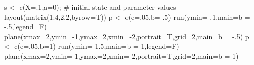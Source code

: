 \documentclass[
  a4paper,
  DIV=11,
  numbers=noendperiod,
  oneside]{scrreprt}
\newenvironment{Shaded}{}{}
\newcommand{\AttributeTok}[1]{\textcolor[rgb]{0.84,0.23,0.29}{#1}}
\newcommand{\CommentTok}[1]{\textcolor[rgb]{0.42,0.45,0.49}{#1}}
\newcommand{\DecValTok}[1]{\textcolor[rgb]{0.00,0.36,0.77}{#1}}
\newcommand{\FloatTok}[1]{\textcolor[rgb]{0.00,0.36,0.77}{#1}}
\newcommand{\FunctionTok}[1]{\textcolor[rgb]{0.44,0.26,0.76}{#1}}
\newcommand{\NormalTok}[1]{\textcolor[rgb]{0.14,0.16,0.18}{#1}}
\newcommand{\OtherTok}[1]{\textcolor[rgb]{0.44,0.26,0.76}{#1}}
\newcommand{\SpecialCharTok}[1]{\textcolor[rgb]{0.00,0.36,0.77}{#1}}
\newcommand{\StringTok}[1]{\textcolor[rgb]{0.01,0.18,0.38}{#1}}
\begin{document}
\begin{Shaded}
\begin{Highlighting}[]
\NormalTok{s }\OtherTok{\textless{}{-}} \FunctionTok{c}\NormalTok{(}\AttributeTok{X=}\NormalTok{.}\DecValTok{1}\NormalTok{,}\AttributeTok{a=}\DecValTok{0}\NormalTok{); }\CommentTok{\# initial state and parameter values}
\FunctionTok{layout}\NormalTok{(}\FunctionTok{matrix}\NormalTok{(}\DecValTok{1}\SpecialCharTok{:}\DecValTok{4}\NormalTok{,}\DecValTok{2}\NormalTok{,}\DecValTok{2}\NormalTok{,}\AttributeTok{byrow=}\NormalTok{T))}
\NormalTok{p }\OtherTok{\textless{}{-}} \FunctionTok{c}\NormalTok{(}\AttributeTok{e=}\NormalTok{.}\DecValTok{05}\NormalTok{,}\AttributeTok{b=}\SpecialCharTok{{-}}\NormalTok{.}\DecValTok{5}\NormalTok{)}
\FunctionTok{run}\NormalTok{(}\AttributeTok{ymin=}\SpecialCharTok{{-}}\NormalTok{.}\DecValTok{1}\NormalTok{,}\AttributeTok{main=}\StringTok{\textquotesingle{}b = {-}.5\textquotesingle{}}\NormalTok{,}\AttributeTok{legend=}\NormalTok{F)}
\FunctionTok{plane}\NormalTok{(}\AttributeTok{xmax=}\DecValTok{2}\NormalTok{,}\AttributeTok{ymin=}\SpecialCharTok{{-}}\DecValTok{1}\NormalTok{,}\AttributeTok{ymax=}\DecValTok{2}\NormalTok{,}\AttributeTok{xmin=}\SpecialCharTok{{-}}\DecValTok{2}\NormalTok{,}\AttributeTok{portrait=}\NormalTok{T,}\AttributeTok{grid=}\DecValTok{2}\NormalTok{,}\AttributeTok{main=}\StringTok{\textquotesingle{}b = {-}.5\textquotesingle{}}\NormalTok{)}
\NormalTok{p }\OtherTok{\textless{}{-}} \FunctionTok{c}\NormalTok{(}\AttributeTok{e=}\NormalTok{.}\DecValTok{05}\NormalTok{,}\AttributeTok{b=}\DecValTok{1}\NormalTok{)}
\FunctionTok{run}\NormalTok{(}\AttributeTok{ymin=}\SpecialCharTok{{-}}\FloatTok{1.5}\NormalTok{,}\AttributeTok{main=}\StringTok{\textquotesingle{}b = 1\textquotesingle{}}\NormalTok{,}\AttributeTok{legend=}\NormalTok{F)}
\FunctionTok{plane}\NormalTok{(}\AttributeTok{xmax=}\DecValTok{2}\NormalTok{,}\AttributeTok{ymin=}\SpecialCharTok{{-}}\DecValTok{1}\NormalTok{,}\AttributeTok{ymax=}\DecValTok{2}\NormalTok{,}\AttributeTok{xmin=}\SpecialCharTok{{-}}\DecValTok{2}\NormalTok{,}\AttributeTok{portrait=}\NormalTok{T,}\AttributeTok{grid=}\DecValTok{2}\NormalTok{,}\AttributeTok{main=}\StringTok{\textquotesingle{}b = 1\textquotesingle{}}\NormalTok{)}
\end{Highlighting}
\end{Shaded}
\end{document}
